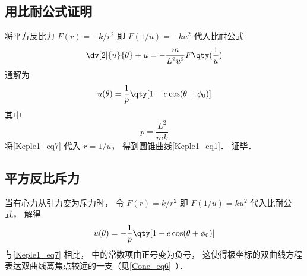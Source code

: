 \subsection{用比耐公式证明}

将平方反比力 $F(r) = -k/r^2$ 即 $F(1/u) = -ku^2$ 代入比耐公式
\begin{equation}
\dv[2]{u}{\theta} + u = -\frac{m}{L^2 u^2} F\qty(\frac 1u)
\end{equation}
通解为
\begin{equation}\label{Keple1_eq7}
u(\theta) = \frac{1}{p} \qty[1 - e\cos(\theta  + \phi_0)]
\end{equation}
其中
\begin{equation}
p = \frac{L^2}{mk}
\end{equation}
将\autoref{Keple1_eq7} 代入 $r = 1/u$， 得到圆锥曲线\autoref{Keple1_eq1}． 证毕．

\subsection{平方反比斥力}
当有心力从引力变为斥力时， 令 $F(r) = k/r^2$ 即 $F(1/u) = ku^2$ 代入比耐公式， 解得
\begin{equation}%
u(\theta) = -\frac{1}{p} \qty[1 + e\cos(\theta  + \phi_0)]
\end{equation}
与\autoref{Keple1_eq7} 相比， 中的常数项由正号变为负号， 这使得极坐标的双曲线方程表达双曲线离焦点较远的一支（见\autoref{Cone_eq6}~）．
